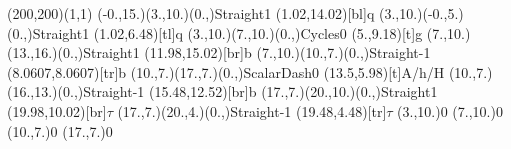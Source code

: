 \documentclass[12pt]{article}
\begin{document}
 \thispagestyle{empty}
	
 \begin{feynartspicture}(200,200)(1,1) 
 \FADiagram{} 
\FAProp(-0.,15.)(3.,10.)(0.,){Straight}{1}
\FALabel(1.02,14.02)[bl]{q}
\FAProp(3.,10.)(-0.,5.)(0.,){Straight}{1}
\FALabel(1.02,6.48)[tl]{q}
\FAProp(3.,10.)(7.,10.)(0.,){Cycles}{0}
\FALabel(5.,9.18)[t]{g}
\FAProp(7.,10.)(13.,16.)(0.,){Straight}{1}
\FALabel(11.98,15.02)[br]{b}
\FAProp(7.,10.)(10.,7.)(0.,){Straight}{-1}
\FALabel(8.0607,8.0607)[tr]{b}
\FAProp(10.,7.)(17.,7.)(0.,){ScalarDash}{0}
\FALabel(13.5,5.98)[t]{A/h/H}
\FAProp(10.,7.)(16.,13.)(0.,){Straight}{-1}
\FALabel(15.48,12.52)[br]{b}
\FAProp(17.,7.)(20.,10.)(0.,){Straight}{1}
\FALabel(19.98,10.02)[br]{$\tau$}
\FAProp(17.,7.)(20.,4.)(0.,){Straight}{-1}
\FALabel(19.48,4.48)[tr]{$\tau$}
\FAVert(3.,10.){0}
\FAVert(7.,10.){0}
\FAVert(10.,7.){0}
\FAVert(17.,7.){0}


 \end{feynartspicture} 
 
\end{document}
